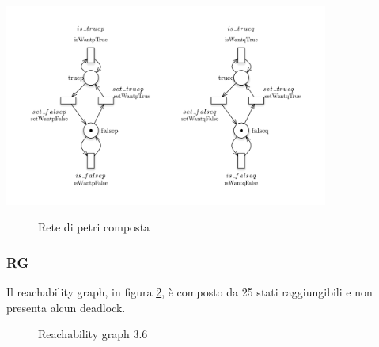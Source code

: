 \documentclass[a4paper]{article}
\begin{document}
\begin{center}
{}
\includegraphics[width=0.8\textwidth]{variables.png}
\end{center}
\newpage
\begin{figure}[!ht]
\centering
{}
\caption{Rete di petri composta} \label{FIG:3.6PN}
\end{figure}
\newpage
\subsubsection{RG}
Il reachability graph, in figura \ref{FIG:3.6RG}, è composto da 25 stati raggiungibili e non presenta alcun deadlock.
\begin{figure}[!ht]
\centering
{}
\caption{Reachability graph 3.6} \label{FIG:3.6RG}
\end{figure}
\newpage
\end{document}
